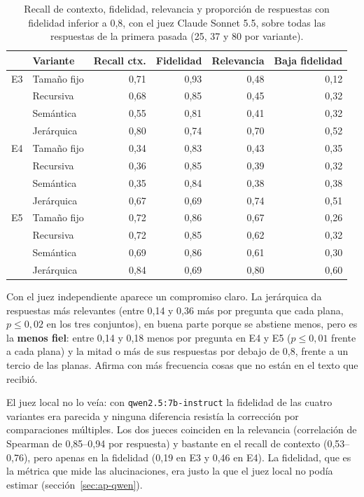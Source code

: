 \begin{table}[htbp]
\centering\small
\setlength{\tabcolsep}{4pt}
\caption[Calidad de las respuestas con el juez Claude Sonnet 5.5]{Recall de contexto, fidelidad, relevancia y proporción de respuestas con fidelidad inferior a 0,8, con el juez Claude Sonnet 5.5, sobre todas las respuestas de la primera pasada (25, 37 y 80 por variante).}
\label{tab:juez-sonnet}
\begin{tabular}{@{}l l rrrr@{}}
\toprule
& \textbf{Variante} & \textbf{Recall ctx.} & \textbf{Fidelidad} & \textbf{Relevancia} & \textbf{Baja fidelidad} \\
\midrule
E3 & Tamaño fijo & 0,71 & 0,93 & 0,48 & 0,12 \\
   & Recursiva   & 0,68 & 0,85 & 0,45 & 0,32 \\
   & Semántica   & 0,55 & 0,81 & 0,41 & 0,32 \\
   & Jerárquica  & 0,80 & 0,74 & 0,70 & 0,52 \\
\midrule
E4 & Tamaño fijo & 0,34 & 0,83 & 0,43 & 0,35 \\
   & Recursiva   & 0,36 & 0,85 & 0,39 & 0,32 \\
   & Semántica   & 0,35 & 0,84 & 0,38 & 0,38 \\
   & Jerárquica  & 0,67 & 0,69 & 0,74 & 0,51 \\
\midrule
E5 & Tamaño fijo & 0,72 & 0,86 & 0,67 & 0,26 \\
   & Recursiva   & 0,72 & 0,85 & 0,62 & 0,32 \\
   & Semántica   & 0,69 & 0,86 & 0,61 & 0,30 \\
   & Jerárquica  & 0,84 & 0,69 & 0,80 & 0,60 \\
\bottomrule
\end{tabular}
\end{table}

Con el juez independiente aparece un compromiso claro. La jerárquica da respuestas más relevantes (entre 0,14 y 0,36 más por pregunta que cada plana, $p \le 0{,}02$ en los tres conjuntos), en buena parte porque se abstiene menos, pero es la \textbf{menos fiel}: entre 0,14 y 0,18 menos por pregunta en E4 y E5 ($p \le 0{,}01$ frente a cada plana) y la mitad o más de sus respuestas por debajo de 0,8, frente a un tercio de las planas. Afirma con más frecuencia cosas que no están en el texto que recibió.

El juez local no lo veía: con \texttt{qwen2.5:7b-instruct} la fidelidad de las cuatro variantes era parecida y ninguna diferencia resistía la corrección por comparaciones múltiples. Los dos jueces coinciden en la relevancia (correlación de Spearman de 0,85--0,94 por respuesta) y bastante en el recall de contexto (0,53--0,76), pero apenas en la fidelidad (0,19 en E3 y 0,46 en E4). La fidelidad, que es la métrica que mide las alucinaciones, era justo la que el juez local no podía estimar (sección~\ref{sec:ap-qwen}).

